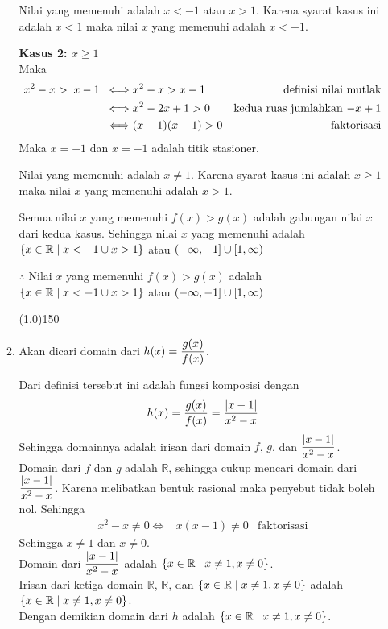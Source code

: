 \begin{enumerate}[leftmargin=*, label={\arabic*}.]
\begin{enumerate}[label={\alph*}.]
    

    Nilai yang memenuhi adalah $x < -1$ atau $x > 1$.
    Karena syarat kasus ini adalah $x < 1$ maka nilai $x$ yang memenuhi adalah
    $x < -1$.

    \textbf{Kasus 2: $x \geq 1$}\\
    Maka
    \begin{align*}
        x^{2}-x > \abs{x-1}
        \iff &x^{2}-x > x-1
        &\text{definisi nilai mutlak} \\
        \iff &x^{2} -2x + 1> 0
        &\text{kedua ruas jumlahkan $-x+1$}\\
        \iff &(x-1)(x-1) > 0
        &\text{faktorisasi}
    \end{align*}
    Maka $x=-1$ dan $x=-1$ adalah titik stasioner.

    

    Nilai yang memenuhi adalah $x \neq 1$.
    Karena syarat kasus ini adalah $x \geq 1$ maka nilai $x$ yang memenuhi adalah
    $x > 1$.
        
    Semua nilai $x$ yang memenuhi $f(x) > g(x)$ adalah gabungan nilai $x$ 
    dari kedua kasus. Sehingga nilai $x$ yang memenuhi adalah 
    $\set*{x \in \mathbb{R} \mid x < -1 \cup x > 1}$
    atau $\oic*{-\infty, -1} \cup \cio*{1, \infty}$
        
    $\therefore$ Nilai $x$ yang memenuhi $f(x) > g(x)$ adalah
    $\set*{x \in \mathbb{R} \mid x < -1 \cup x > 1}$
    atau $\oic*{-\infty, -1} \cup \cio*{1, \infty}$


\begin{center}\line(1,0){150}\end{center}


    \item Akan dicari domain dari $\ds h(x) = \frac{g(x)}{f(x)}$.
    
    Dari definisi tersebut ini adalah fungsi komposisi dengan 
    \[
        h(x) = \frac{g(x)}{f(x)} = \frac{\abs{x-1}}{x^{2}-x}
    \]
    Sehingga domainnya adalah irisan dari domain $f$, $g$, dan 
    $\ds \frac{\abs{x-1}}{x^{2}-x}$.\\
    Domain dari $f$ dan $g$ adalah $\mathbb{R}$, sehingga cukup mencari 
    domain dari $\ds \frac{\abs{x-1}}{x^{2}-x}$. Karena melibatkan 
    bentuk rasional maka penyebut tidak boleh nol. Sehingga
    \begin{align*}
        x^{2}-x \neq 0 \iff &x(x-1)\neq 0
        &\text{faktorisasi}
    \end{align*}
    Sehingga $x \neq 1$ dan $x \neq 0$. \\Domain dari 
    $\ds \frac{\abs{x-1}}{x^{2}-x}$ adalah 
    $\set*{x \in \mathbb{R} \mid x \neq 1, x\neq 0}$.\\ Irisan dari ketiga domain
    $\mathbb{R}$, $\mathbb{R}$, dan $\set*{x \in \mathbb{R} \mid x \neq 1, x\neq 0}$ 
    adalah $\set*{x \in \mathbb{R} \mid x \neq 1, x\neq 0}$.\\
    Dengan demikian domain dari $h$ adalah 
    $\set*{x \in \mathbb{R} \mid x \neq 1, x\neq 0}$.


\end{enumerate}
\end{enumerate}
